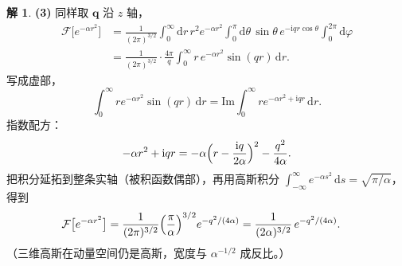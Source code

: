 \documentclass[11pt]{article}
\theoremstyle{remark}
\theoremstyle{definition}
\newtheorem{solution}{解}
\begin{document}
\begin{solution}
\medskip
\noindent\textbf{(3)}
同样取 $\mathbf{q}$ 沿 $z$ 轴，
\begin{align*}
\mathcal{F}\bigl[e^{-\alpha r^2}\bigr]
&=\frac{1}{(2\pi)^{3/2}}
\int_0^{\infty}\mathrm{d}r\,r^2 e^{-\alpha r^2}
\int_0^{\pi}\mathrm{d}\theta\,\sin\theta\,e^{-\mathrm{i}qr\cos\theta}
\int_0^{2\pi}\mathrm{d}\varphi\\
&=\frac{1}{(2\pi)^{3/2}}\cdot\frac{4\pi}{q}
\int_0^{\infty}r\,e^{-\alpha r^2}\sin(qr)\,\mathrm{d}r.
\end{align*}
写成虚部，
\[
\int_0^{\infty}r e^{-\alpha r^2}\sin(qr)\,\mathrm{d}r
=\mathrm{Im}
\int_0^{\infty}r e^{-\alpha r^2+\mathrm{i}qr}\,\mathrm{d}r.
\]
指数配方：
\[
-\alpha r^2+\mathrm{i}qr
=-\alpha\Bigl(r-\frac{\mathrm{i}q}{2\alpha}\Bigr)^2-\frac{q^2}{4\alpha}.
\]
把积分延拓到整条实轴（被积函数偶部），再用高斯积分
$\int_{-\infty}^{\infty}e^{-\alpha s^2}\,\mathrm{d}s=\sqrt{\pi/\alpha}$，得到
\begin{align*}
\mathcal{F}\bigl[e^{-\alpha r^2}\bigr]
&=\frac{1}{(2\pi)^{3/2}}
\Bigl(\frac{\pi}{\alpha}\Bigr)^{3/2}
e^{-q^2/(4\alpha)}
=\frac{1}{(2\alpha)^{3/2}}\,e^{-q^2/(4\alpha)}.
\end{align*}
（三维高斯在动量空间仍是高斯，宽度与 $\alpha^{-1/2}$ 成反比。）
\end{solution}
\end{document}
